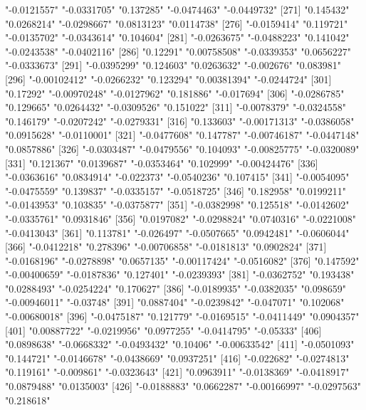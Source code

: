 \begin{Schunk}
\begin{Soutput}
[266] "-0.0121557"   "-0.0331705"   "0.137285"     "-0.0474463"   "-0.0449732"  
[271] "0.145432"     "0.0268214"    "-0.0298667"   "0.0813123"    "0.0114738"   
[276] "-0.0159414"   "0.119721"     "-0.0135702"   "-0.0343614"   "0.104604"    
[281] "-0.0263675"   "-0.0488223"   "0.141042"     "-0.0243538"   "-0.0402116"  
[286] "0.12291"      "0.00758508"   "-0.0339353"   "0.0656227"    "-0.0333673"  
[291] "-0.0395299"   "0.124603"     "0.0263632"    "-0.002676"    "0.083981"    
[296] "-0.00102412"  "-0.0266232"   "0.123294"     "0.00381394"   "-0.0244724"  
[301] "0.17292"      "-0.00970248"  "-0.0127962"   "0.181886"     "-0.017694"   
[306] "-0.0286785"   "0.129665"     "0.0264432"    "-0.0309526"   "0.151022"    
[311] "-0.0078379"   "-0.0324558"   "0.146179"     "-0.0207242"   "-0.0279331"  
[316] "0.133603"     "-0.00171313"  "-0.0386058"   "0.0915628"    "-0.0110001"  
[321] "-0.0477608"   "0.147787"     "-0.00746187"  "-0.0447148"   "0.0857886"   
[326] "-0.0303487"   "-0.0479556"   "0.104093"     "-0.00825775"  "-0.0320089"  
[331] "0.121367"     "0.0139687"    "-0.0353464"   "0.102999"     "-0.00424476" 
[336] "-0.0363616"   "0.0834914"    "-0.022373"    "-0.0540236"   "0.107415"    
[341] "-0.0054095"   "-0.0475559"   "0.139837"     "-0.0335157"   "-0.0518725"  
[346] "0.182958"     "0.0199211"    "-0.0143953"   "0.103835"     "-0.0375877"  
[351] "-0.0382998"   "0.125518"     "-0.0142602"   "-0.0335761"   "0.0931846"   
[356] "0.0197082"    "-0.0298824"   "0.0740316"    "-0.0221008"   "-0.0413043"  
[361] "0.113781"     "-0.026497"    "-0.0507665"   "0.0942481"    "-0.0606044"  
[366] "-0.0412218"   "0.278396"     "-0.00706858"  "-0.0181813"   "0.0902824"   
[371] "-0.0168196"   "-0.0278898"   "0.0657135"    "-0.00117424"  "-0.0516082"  
[376] "0.147592"     "-0.00400659"  "-0.0187836"   "0.127401"     "-0.0239393"  
[381] "-0.0362752"   "0.193438"     "0.0288493"    "-0.0254224"   "0.170627"    
[386] "-0.0189935"   "-0.0382035"   "0.098659"     "-0.00946011"  "-0.03748"    
[391] "0.0887404"    "-0.0239842"   "-0.047071"    "0.102068"     "-0.00680018" 
[396] "-0.0475187"   "0.121779"     "-0.0169515"   "-0.0411449"   "0.0904357"   
[401] "0.00887722"   "-0.0219956"   "0.0977255"    "-0.0414795"   "-0.05333"    
[406] "0.0898638"    "-0.0668332"   "-0.0493432"   "0.10406"      "-0.00633542" 
[411] "-0.0501093"   "0.144721"     "-0.0146678"   "-0.0438669"   "0.0937251"   
[416] "-0.022682"    "-0.0274813"   "0.119161"     "-0.009861"    "-0.0323643"  
[421] "0.0963911"    "-0.0138369"   "-0.0418917"   "0.0879488"    "0.0135003"   
[426] "-0.0188883"   "0.0662287"    "-0.00166997"  "-0.0297563"   "0.218618"    

\end{Soutput}
\end{Schunk}
